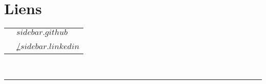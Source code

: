 \documentclass[oneside]{article}
\begin{document}
        \section*{\large Liens}
        \begin{tabular}{cl}
            \faGithub{}   & \href{${sidebar.github}$}{${sidebar.github}$} \\
            \faLinkedin{} & \href{https://www.linkedin.com/in/${sidebar.linkedin}$/}{/${sidebar.linkedin}$} \\
        \end{tabular}
        \vspace{10pt} \\
        \rule{\linewidth}{0.4pt} \\
\end{document}
